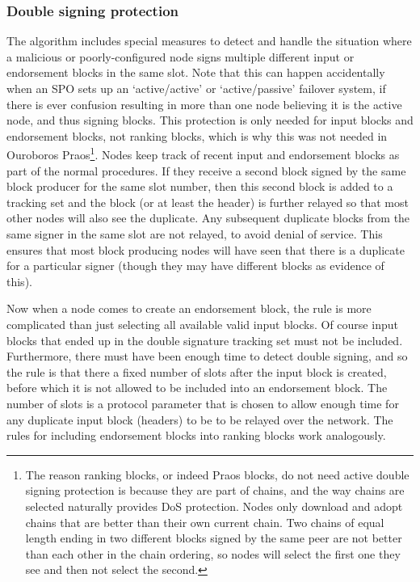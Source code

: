 \documentclass[11pt,a4paper]{article}
\begin{document}
\subsubsection{Double signing protection}
The algorithm includes special measures 
to detect and handle the situation where a malicious or poorly-configured node
signs multiple different input or endorsement blocks in the same slot. Note
that this can happen accidentally when an SPO sets up an `active/active' or
`active/passive' failover system, if there is ever confusion resulting in more
than one node believing it is the active node, and thus signing blocks. This
protection is only needed for input blocks and endorsement blocks, not ranking
blocks, which is why this was not needed in Ouroboros Praos\footnote{The reason
ranking blocks, or indeed Praos blocks, do not need active double signing
protection is because they are part of chains, and the way chains are selected
naturally provides DoS protection. Nodes only download and adopt chains that
are better than their own current chain. Two chains of equal length ending in
two different blocks signed by the same peer are not better than each other in
the chain ordering, so nodes will select the first one they see and then not
select the second.}. Nodes keep track of recent input and endorsement blocks as
part of the normal procedures. If they receive a second block signed by the
same block producer for the same slot number, then this second block is added
to a tracking set and the block (or at least the header) is further relayed so
that most other nodes will also see the duplicate. Any subsequent duplicate
blocks from the same signer in the same slot are not relayed, to avoid denial
of service. This ensures that most block producing nodes will have seen that
there is a duplicate for a particular signer (though they may have different
blocks as evidence of this).

Now when a node comes to create an endorsement block, the rule is more
complicated than just selecting all available valid input blocks. Of course
input blocks that ended up in the double signature tracking set must not be
included. Furthermore, there must have been enough time to detect double
signing, and so the rule is that there a fixed number of slots after the input
block is created, before which it is not allowed to be included into an
endorsement block. The number of slots is a protocol parameter that is chosen
to allow enough time for any duplicate input block (headers) to be to be
relayed over the network. The rules for including endorsement blocks into
ranking blocks work analogously.
\end{document}

